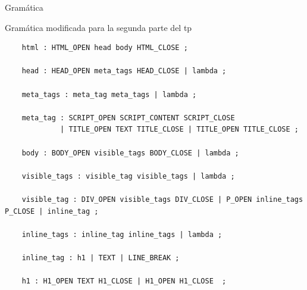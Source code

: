 \documentclass[a4paper,8pt]{article}
\begin{document}
\begin{section}{Gramática}
\begin{subsection}{Gramática modificada para la segunda parte del tp}
\begin{verbatim}
    html : HTML_OPEN head body HTML_CLOSE ;

    head : HEAD_OPEN meta_tags HEAD_CLOSE | lambda ;

    meta_tags : meta_tag meta_tags | lambda ;

    meta_tag : SCRIPT_OPEN SCRIPT_CONTENT SCRIPT_CLOSE 
             | TITLE_OPEN TEXT TITLE_CLOSE | TITLE_OPEN TITLE_CLOSE ;

    body : BODY_OPEN visible_tags BODY_CLOSE | lambda ;

    visible_tags : visible_tag visible_tags | lambda ;

    visible_tag : DIV_OPEN visible_tags DIV_CLOSE | P_OPEN inline_tags P_CLOSE | inline_tag ;

    inline_tags : inline_tag inline_tags | lambda ;

    inline_tag : h1 | TEXT | LINE_BREAK ;

    h1 : H1_OPEN TEXT H1_CLOSE | H1_OPEN H1_CLOSE  ;

\end{verbatim} 


\end{subsection}
\end{section}
\newpage
\end{document}
